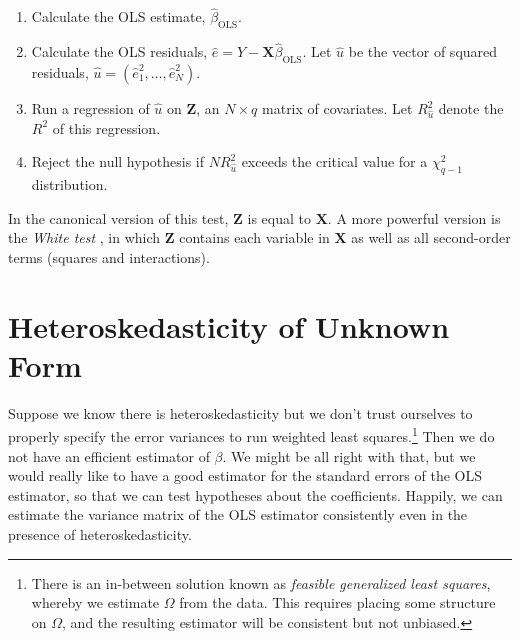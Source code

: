 \documentclass[12pt,oneside,openany]{book}
\providecommand{\tightlist}{%
  \setlength{\itemsep}{0pt}\setlength{\parskip}{0pt}}
\let\rmarkdownfootnote\footnote%
\def\footnote{\protect\rmarkdownfootnote}
\begin{document}
\begin{enumerate}
\def\labelenumi{\arabic{enumi}.}
\tightlist
\item
  Calculate the OLS estimate, \(\hat{\beta}_{\text{OLS}}\).
\item
  Calculate the OLS residuals,
  \(\hat{e} = Y - \mathbf{X} \hat{\beta}_{\text{OLS}}\). Let \(\hat{u}\)
  be the vector of squared residuals,
  \(\hat{u} = (\hat{e}_1^2, \ldots, \hat{e}_N^2)\).
\item
  Run a regression of \(\hat{u}\) on \(\mathbf{Z}\), an \(N \times q\)
  matrix of covariates. Let \(R_{\hat{u}}^2\) denote the \(R^2\) of this
  regression.
\item
  Reject the null hypothesis if \(N R_{\hat{u}}^2\) exceeds the critical
  value for a \(\chi_{q - 1}^2\) distribution.
\end{enumerate}

In the canonical version of this test, \(\mathbf{Z}\) is equal to
\(\mathbf{X}\). A more powerful version is the \emph{White test}
\citep{white1980heteroskedasticity}, in which \(\mathbf{Z}\) contains
each variable in \(\mathbf{X}\) as well as all second-order terms
(squares and interactions).

\section{Heteroskedasticity of Unknown
Form}\label{heteroskedasticity-of-unknown-form}

Suppose we know there is heteroskedasticity but we don't trust ourselves
to properly specify the error variances to run weighted least
squares.\footnote{There is an in-between solution known as
  \emph{feasible generalized least squares}, whereby we estimate
  \(\Omega\) from the data. This requires placing some structure on
  \(\Omega\), and the resulting estimator will be consistent but not
  unbiased.} Then we do not have an efficient estimator of \(\beta\). We
might be all right with that, but we would really like to have a good
estimator for the standard errors of the OLS estimator, so that we can
test hypotheses about the coefficients. Happily, we can estimate the
variance matrix of the OLS estimator consistently even in the presence
of heteroskedasticity.
\end{document}
